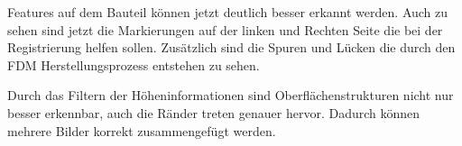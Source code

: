 Features auf dem Bauteil können jetzt deutlich besser erkannt werden. Auch zu sehen
sind jetzt die Markierungen auf der linken und Rechten Seite die bei der Registrierung
helfen sollen. Zusätzlich sind die Spuren und Lücken die durch den FDM 
Herstellungsprozess entstehen zu sehen.

Durch das Filtern der Höheninformationen sind Oberflächenstrukturen nicht nur besser
erkennbar, auch die Ränder treten genauer hervor. 
Dadurch können mehrere Bilder korrekt zusammengefügt werden.

